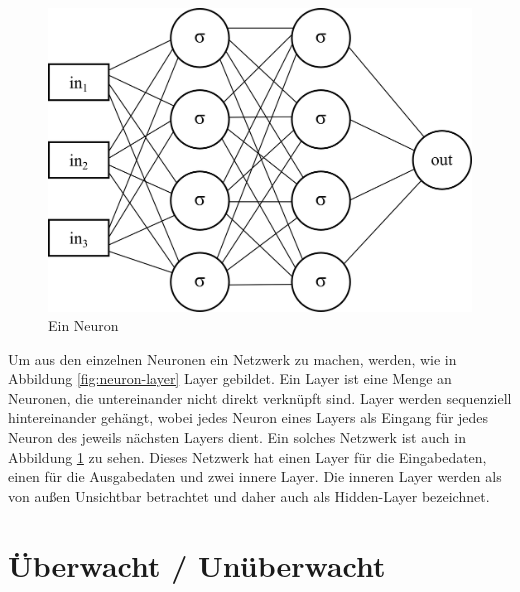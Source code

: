 \begin{figure}
\centering
\includegraphics[scale=1]{images/neuron-network.png}
\caption{Ein Neuron}
\label{fig:neuron-network}
\end{figure}

Um aus den einzelnen Neuronen ein Netzwerk zu machen, werden, wie in Abbildung \ref{fig:neuron-layer} Layer gebildet. Ein Layer ist eine Menge an Neuronen, die untereinander nicht direkt verknüpft sind. Layer werden sequenziell hintereinander gehängt, wobei jedes Neuron eines Layers als Eingang für jedes Neuron des jeweils nächsten Layers dient. Ein solches Netzwerk ist auch in Abbildung \ref{fig:neuron-network} zu sehen. Dieses Netzwerk hat einen Layer für die Eingabedaten, einen für die Ausgabedaten und zwei innere Layer. Die inneren Layer werden als von außen Unsichtbar betrachtet und daher auch als Hidden-Layer bezeichnet.

\section{Überwacht / Unüberwacht}